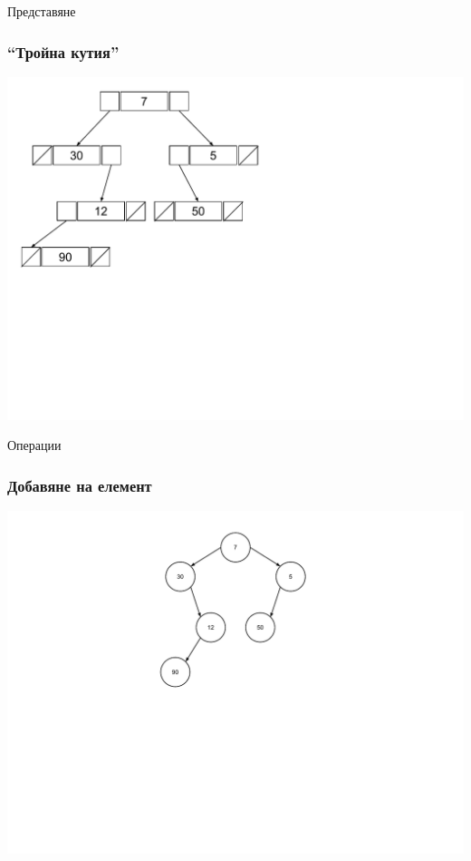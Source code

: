 \documentclass{beamer}
\begin{document}
\begin{frame}
\centerline{Представяне}
\end{frame}


\begin{frame}[fragile]
\frametitle{``Тройна кутия''}

\includegraphics[width=14cm]{images/tree_in_memory}

\end{frame}


\begin{frame}
\centerline{Операции}
\end{frame}

\begin{frame}[fragile]
\frametitle{Добавяне на елемент}

\includegraphics[width=14cm]{images/tree_arbitrary}

\end{frame}
\end{document}
